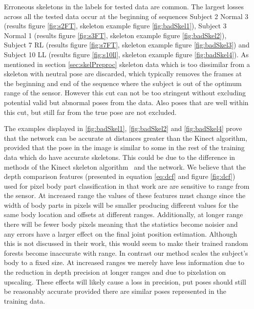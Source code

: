 \documentclass[11pt]{article} %
\begin{document}
Erroneous skeletons in the labels for tested data are common. The largest losses across all the tested data occur at the beginning of sequences Subject 2 Normal 3 (results figure \ref{fig:s2FT}, skeleton example figure \ref{fig:badSkel1}), Subject 3 Normal 1 (results figure \ref{fig:s3FT}, skeleton example figure \ref{fig:badSkel2}), Subject 7 RL (results figure \ref{fig:s7FT}, skeleton example figure \ref{fig:badSkel3}) and Subject 10 LL (results figure \ref{fig:s10ll}, skeleton example figure \ref{fig:badSkel4}). As mentioned in section \ref{sec:skelPreproc} skeleton data which is too dissimilar from a skeleton with neutral pose are discarded, which typically removes the frames at the beginning and end of the sequence where the subject is out of the optimum range of the sensor. However this cut can not be too stringent without excluding potential valid but abnormal poses from the data. Also poses that are well within this cut, but still far from the true pose are not excluded. 

The examples displayed in \ref{fig:badSkel1}, \ref{fig:badSkel2} and \ref{fig:badSkel4} prove that the network can be accurate at distances greater than the Kinect algorithm, provided that the pose in the image is similar to some in the rest of the training data which do have accurate skeletons. This could be due to the difference in methods of the Kinect skeleton algorithm~\cite{Shotton2012} and the network. We believe that the depth comparison features (presented in equation \ref{eq:dcf} and figure \ref{fig:dcf}) used for pixel body part classification in that work are are sensitive to range from the sensor. At increased range the values of these features must change since the width of body parts in pixels will be smaller producing different values for the same body location and offsets at different ranges. Additionally, at longer range there will be fewer body pixels meaning that the statistics become noisier and any errors have a larger effect on the final joint position estimation. Although this is not discussed in their work, this would seem to make their trained random forests become inaccurate with range. In contrast our method scales the subject's body to a fixed size. At increased ranges we merely have less information due to the reduction in depth precision at longer ranges and due to pixelation on upscaling. These effects will likely cause a loss in precision, put poses should still be reasonably accurate provided there are similar poses represented in the training data.
\end{document}
